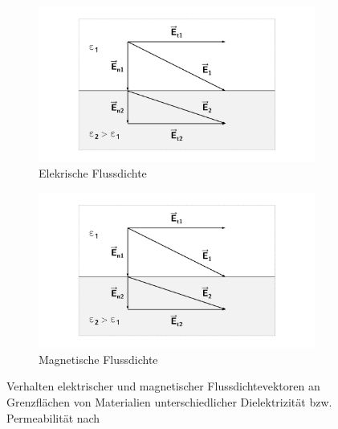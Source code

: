 \begin{figure}[ht]
    \centering
    \begin{subfigure}[b]{0.4\textwidth}
        \includegraphics[page = 3, width=\textwidth, trim = 4.8cm 1cm 4.8cm 1cm, clip]{Abbildungen/Kapitel2/Feldvektoren_an_Grenzflaechen.pdf}
        \caption{Elekrische Flussdichte}\label{subfig:2_Elektrische_Flussdichte_an_Grenzflaeche}
    \end{subfigure}
    \hspace{2cm}
    \begin{subfigure}[b]{0.4\textwidth}
        \includegraphics[page = 4, width=\textwidth, trim = 4.8cm 1cm 4.8cm 1cm, clip]{Abbildungen/Kapitel2/Feldvektoren_an_Grenzflaechen.pdf}
        \caption{Magnetische Flussdichte}\label{subfig:2_Magnetische_Flussdichte_an_Grenzflaeche}
    \end{subfigure}
    \caption[Verhalten elektrischer und magnetischer Flussdichtevektoren an Grenzflächen von Materialien unterschiedlicher Dielektrizität bzw. Permeabilität]{Verhalten elektrischer und magnetischer Flussdichtevektoren an Grenzflächen von \mbox{Materialien} unterschiedlicher Dielektrizität bzw. Permeabilität nach~\cite{EM_Schirmung}}
    \label{fig:2_Flussdichten_an_Grenzflaechen}
\end{figure}

